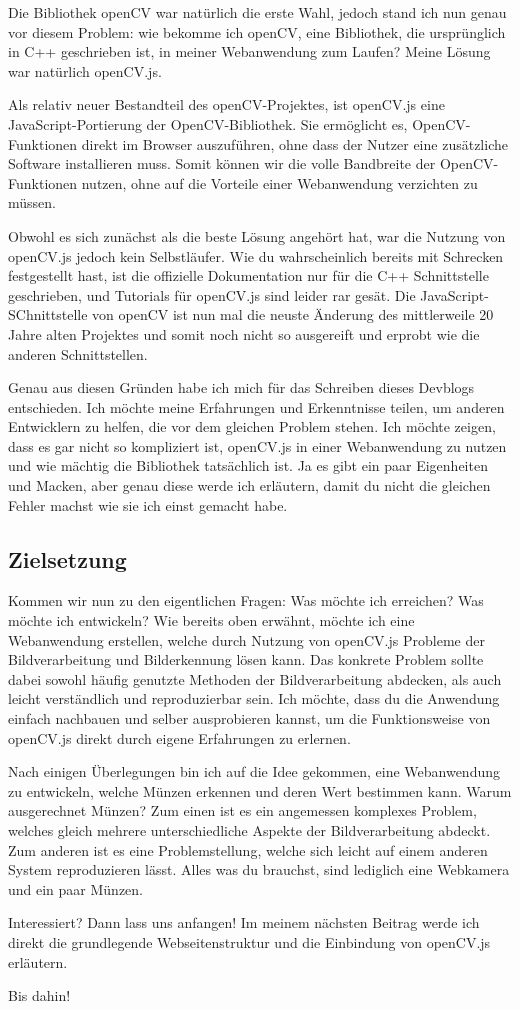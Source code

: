 Die Bibliothek openCV war natürlich die erste Wahl, jedoch stand ich nun genau vor diesem Problem: wie bekomme ich openCV, eine Bibliothek, die ursprünglich in C++ geschrieben ist, in meiner Webanwendung zum Laufen? Meine Lösung war natürlich openCV.js.

Als relativ neuer Bestandteil des openCV-Projektes, ist openCV.js eine JavaScript-Portierung der OpenCV-Bibliothek. Sie ermöglicht es, OpenCV-Funktionen direkt im Browser auszuführen, ohne dass der Nutzer eine zusätzliche Software installieren muss. Somit können wir die volle Bandbreite der OpenCV-Funktionen nutzen, ohne auf die Vorteile einer Webanwendung verzichten zu müssen.

Obwohl es sich zunächst als die beste Lösung angehört hat, war die Nutzung von openCV.js jedoch kein Selbstläufer. Wie du wahrscheinlich bereits mit Schrecken festgestellt hast, ist die offizielle Dokumentation nur für die C++ Schnittstelle geschrieben, und Tutorials für openCV.js sind leider rar gesät. Die JavaScript-SChnittstelle von openCV ist nun mal die neuste Änderung des mittlerweile 20 Jahre alten Projektes und somit noch nicht so ausgereift und erprobt wie die anderen Schnittstellen.

Genau aus diesen Gründen habe ich mich für das Schreiben dieses Devblogs entschieden. Ich möchte meine Erfahrungen und Erkenntnisse teilen, um anderen Entwicklern zu helfen, die vor dem gleichen Problem stehen. Ich möchte zeigen, dass es gar nicht so kompliziert ist, openCV.js in einer Webanwendung zu nutzen und wie mächtig die Bibliothek tatsächlich ist. Ja es gibt ein paar Eigenheiten und Macken, aber genau diese werde ich erläutern, damit du nicht die gleichen Fehler machst wie sie ich einst gemacht habe.

\subsection{Zielsetzung}
Kommen wir nun zu den eigentlichen Fragen: Was möchte ich erreichen? Was möchte ich entwickeln? Wie bereits oben erwähnt, möchte ich eine Webanwendung erstellen, welche durch Nutzung von openCV.js Probleme der Bildverarbeitung und Bilderkennung lösen kann. Das konkrete Problem sollte dabei sowohl häufig genutzte Methoden der Bildverarbeitung abdecken, als auch leicht verständlich und reproduzierbar sein. Ich möchte, dass du die Anwendung einfach nachbauen und selber ausprobieren kannst, um die Funktionsweise von openCV.js direkt durch eigene Erfahrungen zu erlernen.

Nach einigen Überlegungen bin ich auf die Idee gekommen, eine Webanwendung zu entwickeln, welche Münzen erkennen und deren Wert bestimmen kann. Warum ausgerechnet Münzen? Zum einen ist es ein angemessen komplexes Problem, welches gleich mehrere unterschiedliche Aspekte der Bildverarbeitung abdeckt. Zum anderen ist es eine Problemstellung, welche sich leicht auf einem anderen System reproduzieren lässt. Alles was du brauchst, sind lediglich eine Webkamera und ein paar Münzen.

Interessiert? Dann lass uns anfangen! Im meinem nächsten Beitrag werde ich direkt die grundlegende Webseitenstruktur und die Einbindung von openCV.js erläutern. 

Bis dahin!